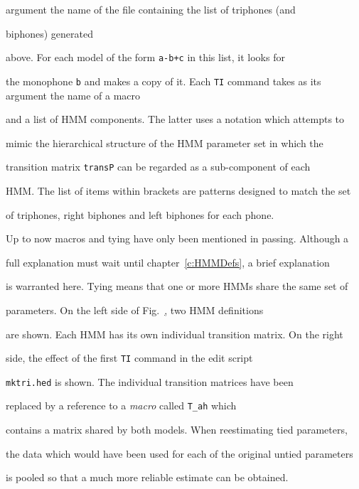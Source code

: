 argument the name of the file containing the list of triphones (and


biphones) generated


above.  For each model of the form \texttt{a-b+c} in this list, it looks for


the monophone \texttt{b} and makes a copy of it. Each \texttt{TI} command takes as its argument the name of a macro


and a list of HMM components.  The latter uses a notation which attempts to


mimic the hierarchical structure of the HMM parameter set in which the


transition matrix \texttt{transP} can be regarded as a sub-component of each


HMM.  The list of items within brackets are patterns designed to match the set


of triphones, right biphones and left biphones for each phone.










Up to now macros and tying have only been mentioned in passing.  Although a


full explanation must wait until chapter~\ref{c:HMMDefs}, a brief explanation


is warranted here.  Tying means that one or more HMMs share the same set of


parameters.  On the left side of Fig.~\href{f:egtranstie}, two HMM definitions


are shown.  Each HMM has its own individual transition matrix.  On the right


side, the effect of the first \texttt{TI} command in the edit script


\texttt{mktri.hed} is shown.  The individual transition matrices have been


replaced by a reference to a \textit{macro} called \texttt{T\_ah} which


contains a matrix shared by both models.  When reestimating tied parameters,


the data which would have been used for each of the original untied parameters


is pooled so that a much more reliable estimate can be obtained.





